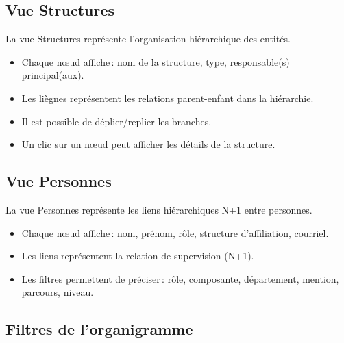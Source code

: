 \subsection{Vue Structures}

La vue Structures repr\'esente l'organisation hi\'erarchique des entit\'es.

\begin{itemize}
  \item Chaque n\oe ud affiche\,: nom de la structure, type, responsable(s) principal(aux).
  \item Les li\`egnes repr\'esentent les relations parent-enfant dans la hi\'erarchie.
  \item Il est possible de d\'eplier/replier les branches.
  \item Un clic sur un n\oe ud peut afficher les d\'etails de la structure.
\end{itemize}


\subsection{Vue Personnes}

La vue Personnes repr\'esente les liens hi\'erarchiques N+1 entre personnes.

\begin{itemize}
  \item Chaque n\oe ud affiche\,: nom, pr\'enom, r\^ole, structure d'affiliation, courriel.
  \item Les liens repr\'esentent la relation de supervision (N+1).
  \item Les filtres permettent de pr\'eciser\,: r\^ole, composante, d\'epartement, mention, parcours, niveau.
\end{itemize}


\subsection{Filtres de l'organigramme}

